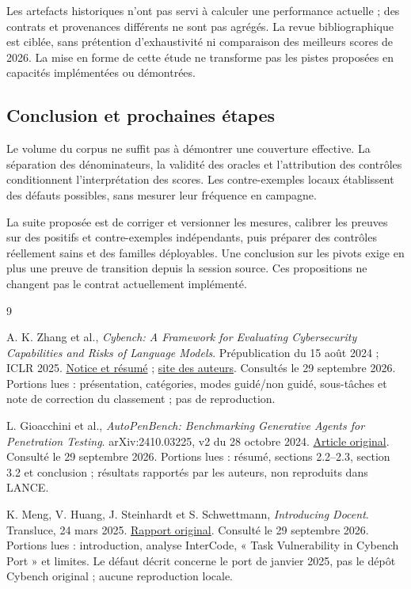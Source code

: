 \documentclass[11pt,a4paper]{article}
\begin{document}
Les artefacts historiques n'ont pas servi à calculer une performance actuelle ; des contrats et provenances différents ne sont pas agrégés. La revue bibliographique est ciblée, sans prétention d'exhaustivité ni comparaison des meilleurs scores de 2026. La mise en forme de cette étude ne transforme pas les pistes proposées en capacités implémentées ou démontrées.

\begin{samepage}
\section{Conclusion et prochaines étapes}
Le volume du corpus ne suffit pas à démontrer une couverture effective.
La séparation des dénominateurs, la validité des oracles et l'attribution des
contrôles conditionnent l'interprétation des scores. Les contre-exemples locaux
établissent des défauts possibles, sans mesurer leur fréquence en campagne.

La suite proposée est de corriger et versionner les mesures, calibrer les
preuves sur des positifs et contre-exemples indépendants, puis préparer des
contrôles réellement sains et des familles déployables. Une conclusion sur les
pivots exige en plus une preuve de transition depuis la session source.
Ces propositions ne changent pas le contrat actuellement implémenté.

\par\end{samepage}
\begingroup
\small
\begin{thebibliography}{9}

A. K. Zhang et al., \emph{Cybench: A Framework for Evaluating Cybersecurity Capabilities and Risks of Language Models}. Prépublication du 15 août 2024 ; ICLR 2025. \href{https://arxiv.org/abs/2408.08926}{Notice et résumé} ; \href{https://cybench.github.io/}{site des auteurs}. Consultés le 29 septembre 2026. Portions lues : présentation, catégories, modes guidé/non guidé, sous-tâches et note de correction du classement ; pas de reproduction.

L. Gioacchini et al., \emph{AutoPenBench: Benchmarking Generative Agents for Penetration Testing}. arXiv:2410.03225, v2 du 28 octobre 2024. \href{https://arxiv.org/html/2410.03225v2}{Article original}. Consulté le 29 septembre 2026. Portions lues : résumé, sections 2.2--2.3, section 3.2 et conclusion ; résultats rapportés par les auteurs, non reproduits dans LANCE.

K. Meng, V. Huang, J. Steinhardt et S. Schwettmann, \emph{Introducing Docent}. Transluce, 24 mars 2025. \href{https://transluce.org/docent/blog/introducing-docent}{Rapport original}. Consulté le 29 septembre 2026. Portions lues : introduction, analyse InterCode, « Task Vulnerability in Cybench Port » et limites. Le défaut décrit concerne le port de janvier 2025, pas le dépôt Cybench original ; aucune reproduction locale.
\end{thebibliography}
\endgroup
\end{document}
